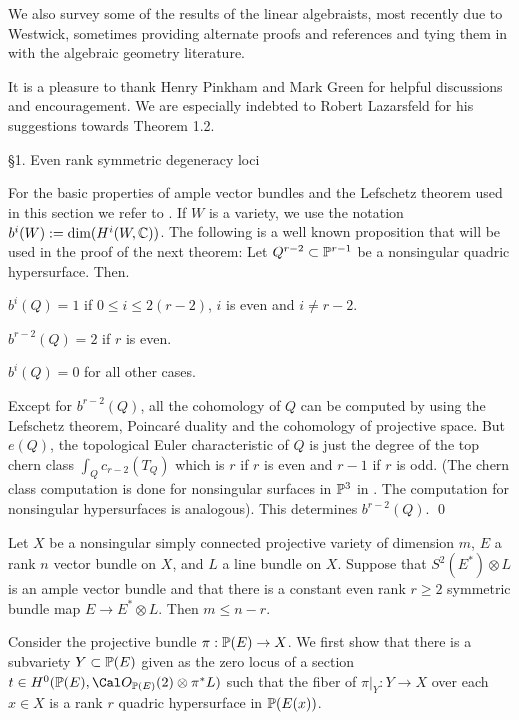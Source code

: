 We also survey some of the results of the linear algebraists,
most recently due to Westwick, sometimes providing alternate proofs 
and references and tying them in with the algebraic geometry literature.

It is a pleasure to thank Henry Pinkham and Mark Green for helpful
discussions and encouragement. We are especially indebted
to Robert Lazarsfeld for his suggestions towards Theorem 1.2.

\heading \S 1. Even rank symmetric degeneracy loci \endheading

For the basic properties of ample vector bundles and the Lefschetz
theorem used in this section we refer to \cite{Laz}. If $W$ is
a variety, we use the notation $b^i(W) := \text{dim} (H^i(W,\Bbb C))$.
The following is a well known proposition that will be used in the proof of
the next theorem: 
 Let $Q^{r-2} \subset \Bbb P^{r-1}$ be a nonsingular
quadric hypersurface. Then.
\roster
\item $b^i(Q) = 1$ if $0 \le i \le 2(r-2)$, $i$ is even and $i \ne r-2$.
\item $b^{r-2}(Q) = 2$ if $r$ is even.
\item $b^i(Q) = 0$ for all other cases.
\endroster
\endproclaim
 
Except for $b^{r-2}(Q)$, all the cohomology of $Q$ can be computed 
by using the Lefschetz theorem, Poincar\'{e}
duality and the cohomology of projective space. 
But $e(Q)$, the topological Euler characteristic of $Q$
is just the degree of the top chern class $\int_Q c_{r-2}(T_Q)$
which is $r$ if $r$ is even and $r-1$ if $r$ is
odd. (The chern class 
 computation is done for nonsingular surfaces in $\Bbb P^{3}$ in
\cite{GH, pg 601}. The computation for nonsingular hypersurfaces is
 analogous).
This determines $b^{r-2}(Q)$.
\qed
\enddemo

 Let $X$ be a nonsingular simply connected projective
variety of dimension $m$, $E$ a rank $n$ vector bundle on $X$, and $L$
a line bundle on $X$. Suppose that $S^2(E^{*}) \otimes L$ is an ample 
vector bundle and that there is a constant even rank $r \ge 2$
symmetric bundle map $E \to E^{*} \otimes L$. Then $m \le n-r$.
\endproclaim

Consider the projective bundle  $\pi: \Bbb P(E) \to X$. We first show that 
there is a subvariety $Y \subset \Bbb P(E)$  given as the zero locus
of a section $t \in H^0(\ppp(E), \co_{\ppp(E)}(2) \otimes \pi^{*}L)$
such that the fiber of $\pi \vert_Y : Y \to X$ over each $x \in X$
is a rank $r$ quadric hypersurface in $\Bbb P(E(x))$.

